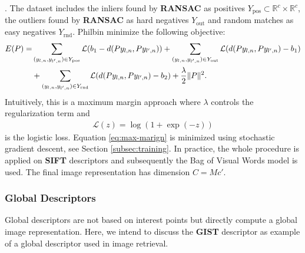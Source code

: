 .
The dataset includes the inliers found by \textbf{RANSAC} as positives $Y_{\text{pos}} \subset \mathbb{R}^c \times \mathbb{R}^c$, the outliers found by \textbf{RANSAC} as hard negatives $Y_{\text{out}}$ and random matches as easy negatives $Y_{\text{rnd}}$. Philbin \etal minimize the following objective:
\begin{align}
    E(P) =& \sum_{(y_{l,n},y_{l',n}) \in Y_{\text{pos}}} \mathcal{L}(b_1 - d(P y_{l,n}, P y_{l',n})) + \sum_{(y_{l,n},y_{l',n})\in Y_{\text{out}}} \mathcal{L}(d(P y_{l,n}, P y_{l',n}) - b_1)\notag\\
    &+ \sum_{(y_{l,n},y_{l',n}) \in Y_{\text{rnd}}} \mathcal{L}(d(P y_{l,n}, P y_{l',n}) - b_2) + \frac{\lambda}{2} \|P\|^2\label{eq:max-marign}.
\end{align}
Intuitively, this is a maximum margin approach where $\lambda$ controls the regularization term and
\begin{align}
    \mathcal{L}(z) = \log(1 + \exp(-z))
\end{align}
is the logistic loss. Equation \eqref{eq:max-marign} is minimized using stochastic gradient descent, see Section \ref{subsec:training}. In practice, the whole procedure is applied on \textbf{SIFT} \cite{Lowe:2004} descriptors and subsequently the Bag of Visual Words model is used. The final image representation has dimension $C = M c'$.

\subsubsection{Global Descriptors}
\label{subsubsec:global-descriptors}

Global descriptors are not based on interest points but directly compute a global image representation.
Here, we intend to discuss the \textbf{GIST} \cite{OlivaTorralba:2001} descriptor as example of a global descriptor used in image retrieval.

